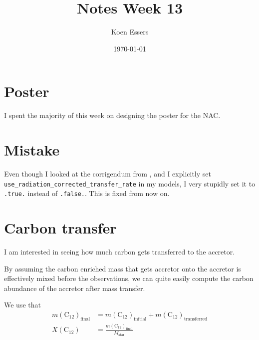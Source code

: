 \documentclass[a4paper,10pt]{article}
\title{Notes Week 13}
\author{Koen Essers}
\date{\today}
\begin{document}
\setuplayout
\section{Poster}
I spent the majority of this week on designing the poster for the NAC.

\section{Mistake}
Even though I looked at the corrigendum from \citet{temmink2025}, and I explicitly set \lstinline[style=output, breaklines=true]|use_radiation_corrected_transfer_rate| in my models, I very stupidly set it to \lstinline[style=output, breaklines=true]|.true.| instead of \lstinline[style=output, breaklines=true]|.false.|. This is fixed from now on.


\section{Carbon transfer}

I am interested in seeing how much carbon gets transferred to the accretor.
\begin{figure}[ht]
    \centering
\end{figure}

\begin{figure}[ht]
    \centering
\end{figure}

By assuming the carbon enriched mass that gets accretor onto the accretor is effectively mixed before the observations, we can quite easily compute the carbon abundance of the accretor after mass transfer.

We use that
\begin{align*}
    m (\text{C}_{12})_\text{final} &= m (\text{C}_{12})_\text{initial} + m (\text{C}_{12})_\text{transferred}\\
    X(\text{C}_{12}) &= \frac{m (\text{C}_{12})_\text{final}}{M_\text{star}}\\
\end{align*}
\end{document}
